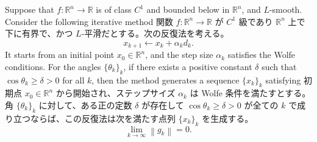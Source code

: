 \documentclass[0_main]{subfiles}
\begin{document}
\begin{theorem}
    \label{thm:line-search-global-convergence}
    \ifEn
        Suppose that $f \colon \mathbb{R}^n \to \mathbb{R}$ is of class $C^1$ and bounded below in $\mathbb{R}^n$, and $L$-smooth. Consider the following iterative method
    \else
        関数 $f \colon \mathbb{R}^n \to \mathbb{R}$ が $C^1$ 級であり $\mathbb{R}^n$ 上で下に有界で、かつ $L$-平滑だとする。次の反復法を考える。
    \fi
    \begin{equation*}
        x_{k+1} \gets x_k + \alpha_k d_k.
    \end{equation*}
    \ifEn
        It starts from an initial point $x_0 \in \mathbb{R}^n$, and the step size $\alpha_k$ satisfies the Wolfe conditions. For the angles $\{ \theta_k \}_k$, if there exists a positive constant $\delta$ such that $\cos \theta_k \geq \delta > 0$ for all $k$, then the method generates a sequence $\{ x_k \}_k$ satisfying
    \else
        初期点 $x_0 \in \mathbb{R}^n$ から開始され、ステップサイズ $\alpha_k$ は Wolfe 条件を満たすとする。角 $\{ \theta_k \}_k$ に対して、ある正の定数 $\delta$ が存在して $\cos \theta_k \geq \delta > 0$ が全ての $k$ で成り立つならば、この反復法は次を満たす点列 $\{ x_k \}_k$ を生成する。
    \fi
    \begin{equation*}
        \lim_{k \to \infty} \left\lVert g_k \right\rVert = 0.
    \end{equation*}
\end{theorem}
\end{document}
